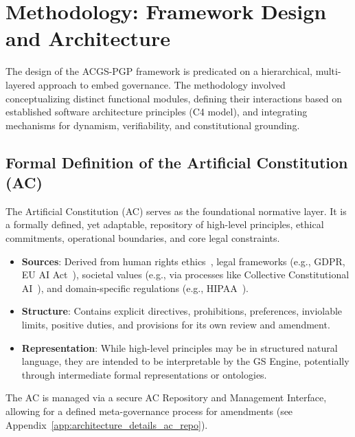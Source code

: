 \documentclass[sigconf,review,anonymous=false]{acmart} %
\begin{document}
\section{Methodology: Framework Design and Architecture}
\label{sec:methodology}
The design of the ACGS-PGP framework is predicated on a hierarchical, multi-layered approach to embed governance. The methodology involved conceptualizing distinct functional modules, defining their interactions based on established software architecture principles (C4 model), and integrating mechanisms for dynamism, verifiability, and constitutional grounding.

\subsection{Formal Definition of the Artificial Constitution (AC)}
The Artificial Constitution (AC) serves as the foundational normative layer. It is a formally defined, yet adaptable, repository of high-level principles, ethical commitments, operational boundaries, and core legal constraints.
\begin{itemize}
    \item \textbf{Sources}: Derived from human rights ethics~\cite{MartinezComplianceByDesign19}, legal frameworks (e.g., GDPR, EU AI Act~\cite{EUAIAct24}), societal values (e.g., via processes like Collective Constitutional AI~\cite{AnthropicCollectiveConstitutionalAI23}), and domain-specific regulations (e.g., HIPAA~\cite{AhnHIPAAAgenticAI25}).
    \item \textbf{Structure}: Contains explicit directives, prohibitions, preferences, inviolable limits, positive duties, and provisions for its own review and amendment.
    \item \textbf{Representation}: While high-level principles may be in structured natural language, they are intended to be interpretable by the GS Engine, potentially through intermediate formal representations or ontologies.
\end{itemize}
The AC is managed via a secure AC Repository and Management Interface, allowing for a defined meta-governance process for amendments (see Appendix~\ref{app:architecture_details_ac_repo}).
\end{document}
